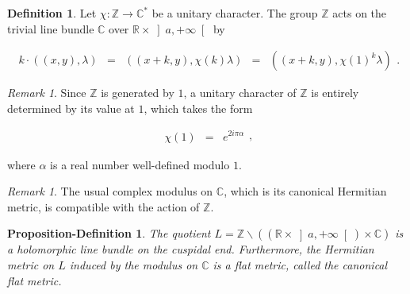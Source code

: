 \documentclass{jams-l}
\newtheorem{proposition-definition}[theorem]{Proposition-Definition}
\theoremstyle{definition}
\newtheorem{definition}[theorem]{Definition}
\theoremstyle{remark}
\newtheorem{remark}[theorem]{Remark}
\numberwithin{equation}{section}
\begin{document}
        \begin{definition}
        
            Let $\chi : \mathbb{Z} \longrightarrow \mathbb{C}^{\ast}$ be a unitary character. The group $\mathbb{Z}$ acts on the trivial line bundle $\mathbb{C}$ over $\mathbb{R} \times \left] a, +\infty \right[$ by
            
            \[ \begin{array}{lllll}
                    k \cdot \left( \left( x, y \right), \lambda \right) & = & \left( \left( x+k, y \right), \chi \left( k \right) \lambda \right) & = & \left( \left( x+k, y \right), \chi \left( 1 \right)^k \lambda \right)
                \end{array} . \]
        
        \end{definition}
        
        \begin{remark}
        
            Since $\mathbb{Z}$ is generated by $1$, a unitary character of $\mathbb{Z}$ is entirely determined by its value at $1$, which takes the form
            
            \[ \begin{array}{lll}
                    \chi \left( 1 \right) & = & e^{2 i \pi \alpha}
                \end{array} , \]
            
            \noindent where $\alpha$ is a real number well-defined modulo $1$.
        
        \end{remark}
        
        \begin{remark}
        
            The usual complex modulus on $\mathbb{C}$, which is its canonical Hermitian metric, is compatible with the action of $\mathbb{Z}$.
        
        \end{remark}
        
        \begin{proposition-definition}
        
            The quotient $L = \mathbb{Z} \backslash \left( \left( \mathbb{R} \times \left] a, +\infty \right[ \right) \times \mathbb{C} \right)$ is a holomorphic line bundle on the cuspidal end. Furthermore, the Hermitian metric on $L$ induced by the modulus on $\mathbb{C}$ is a flat metric, called the canonical flat metric.
        
        \end{proposition-definition}
        
\end{document}
